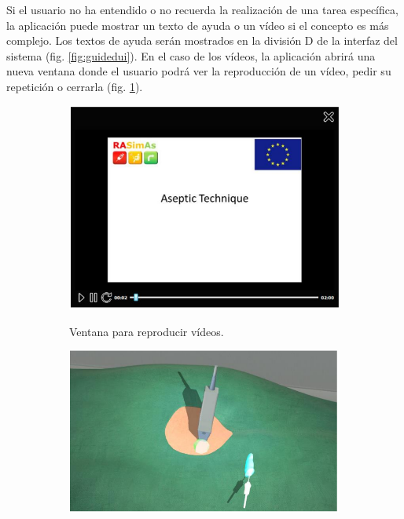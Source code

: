Si el usuario no ha entendido o no recuerda la realización de una tarea específica, la aplicación puede mostrar un texto de ayuda o un vídeo si el concepto es más complejo. Los textos de ayuda serán mostrados en la división D de la interfaz del sistema (fig. \ref{fig:guidedui}). En el caso de los vídeos, la aplicación abrirá una nueva ventana donde el usuario podrá ver la reproducción de un vídeo, pedir su repetición o cerrarla (fig. \ref{fig:video}).



\begin{figure}[ht]
    \begin{subfigure}[b]{0.5\linewidth}
        \centering
        {\includegraphics[width=\linewidth]{IMG/video.PNG}}
        \caption{Ventana para reproducir vídeos.\label{fig:video}}
    \end{subfigure}
    \null\hfill
     \begin{subfigure}[b]{0.5\linewidth}
        \centering
        {\includegraphics[width=\linewidth]{IMG/viewhelp.PNG}}

\end{subfigure}
\end{figure}
